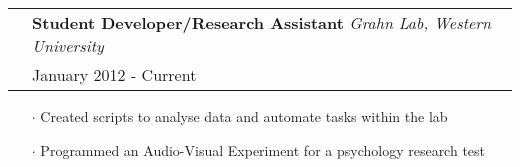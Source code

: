 \documentclass[letterpaper, oneside, final]{scrartcl} %
\newcommand{\gray}{\rowcolor[gray]{.90}} %
\begin{document}
\begin{center}
\vspace{-0.05cm}

\begin{tabularx}{0.97\linewidth}{>{\raggedleft\scshape}p{0cm}X}
\gray & \textbf{Student Developer/Research Assistant} \textit{Grahn Lab, Western University}\\
\gray & {January 2012 - Current}\\
\end{tabularx}
\vspace{-0.1cm}
\begin{itemize} \itemsep-0.2cm
\item[$\cdot$] Created scripts to analyse data and automate tasks within the lab
\item[$\cdot$] Programmed an Audio-Visual Experiment for a psychology research test\\

\end{itemize}


\end{center}
\end{document}
